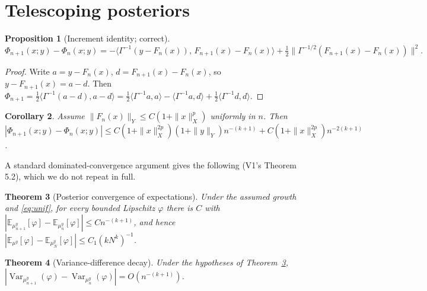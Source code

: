 \documentclass[11pt]{article}
\newtheorem{theorem}{Theorem}[section]
\newtheorem{proposition}[theorem]{Proposition}
\newtheorem{corollary}[theorem]{Corollary}
\theoremstyle{definition}
\theoremstyle{remark}
\newcommand{\E}{\mathbb{E}}
\newcommand{\Var}{\operatorname{Var}}
\begin{document}
\section{Telescoping posteriors}\label{sec:frame}

\begin{proposition}[Increment identity; correct]\label{prop:inc}
$\displaystyle \Phi_{n+1}(x;y)-\Phi_n(x;y)
   =-\langle\Gamma^{-1}(y-F_n(x)),\,F_{n+1}(x)-F_n(x)\rangle
    +\tfrac12\|\Gamma^{-1/2}(F_{n+1}(x)-F_n(x))\|^2.$
\end{proposition}
\begin{proof}
Write $a=y-F_n(x)$, $d=F_{n+1}(x)-F_n(x)$, so $y-F_{n+1}(x)=a-d$. Then
$\Phi_{n+1}=\tfrac12\langle\Gamma^{-1}(a-d),a-d\rangle
=\tfrac12\langle\Gamma^{-1}a,a\rangle-\langle\Gamma^{-1}a,d\rangle+\tfrac12\langle\Gamma^{-1}d,d\rangle$.
\end{proof}

\begin{corollary}\label{cor:incbound}
Assume $\|F_n(x)\|_Y\le C(1+\|x\|_X^p)$ uniformly in $n$. Then
$|\Phi_{n+1}(x;y)-\Phi_n(x;y)|\le C(1+\|x\|_X^{2p})(1+\|y\|_Y)n^{-(k+1)}+C(1+\|x\|_X^{2p})n^{-2(k+1)}$.
\end{corollary}

A standard dominated-convergence argument gives the following (V1's Theorem 5.2), which we do not
repeat in full.

\begin{theorem}[Posterior convergence of expectations]\label{thm:conv}
Under the assumed growth and \eqref{eq:unif}, for every bounded Lipschitz $\varphi$ there is $C$
with $|\E_{\mu^y_{n+1}}[\varphi]-\E_{\mu^y_n}[\varphi]|\le Cn^{-(k+1)}$, and hence
$|\E_{\mu^y}[\varphi]-\E_{\mu^y_N}[\varphi]|\le C_1(kN^k)^{-1}$.
\end{theorem}

\begin{theorem}[Variance-difference decay]\label{thm:var}
Under the hypotheses of Theorem~\ref{thm:conv}, $|\Var_{\mu^y_{n+1}}(\varphi)-\Var_{\mu^y_n}(\varphi)|=O(n^{-(k+1)})$.
\end{theorem}
\end{document}
